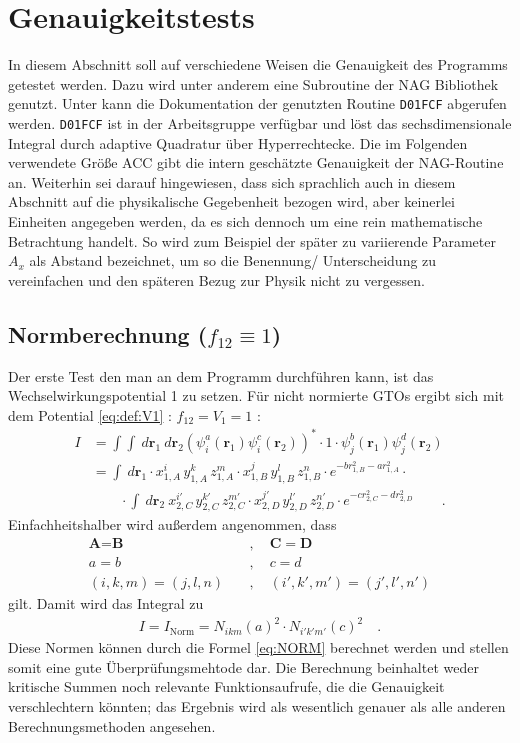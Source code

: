 \section{Genauigkeitstests}
%
In diesem Abschnitt soll auf verschiedene Weisen die Genauigkeit des Programms 
getestet werden. Dazu wird unter anderem eine Subroutine der NAG Bibliothek 
genutzt. Unter \cite{o:1a} kann die Dokumentation der genutzten Routine 
\texttt{D01FCF} 
abgerufen werden. \texttt{D01FCF} ist in der Arbeitsgruppe verfügbar und löst 
das 
sechsdimensionale Integral durch adaptive Quadratur über Hyperrechtecke. Die 
im Folgenden verwendete Größe ACC gibt die intern geschätzte Genauigkeit der 
NAG-Routine an. Weiterhin sei darauf hingewiesen, dass 
sich sprachlich auch in diesem Abschnitt auf die 
physikalische Gegebenheit bezogen wird, aber keinerlei 
Einheiten angegeben werden, da es sich dennoch um eine 
rein mathematische Betrachtung handelt. So wird zum 
Beispiel der später zu variierende Parameter $A_x$ als 
Abstand bezeichnet, um so die Benennung/ Unterscheidung zu 
vereinfachen und den späteren Bezug zur Physik nicht zu 
vergessen.
%
%
%
\subsection{Normberechnung ($f_{12}\equiv 1$)}\label{sec:T:norm}
%
Der erste Test den man an dem Programm durchführen kann, ist das 
Wechselwirkungspotential 1 zu setzen. Für nicht normierte GTOs ergibt sich 
mit dem Potential \ref{eq:def:V1} :  $f_{12}=V_1=1$ :
%
\begin{align*}
I&=\int\int\ d\textbf{r}_1\ d\textbf{r}_2 
(\psi_i^a(\textbf{r}_1)\psi_i^c(\textbf{r}_2))^*\cdot  1 \cdot  
\psi_j^b(\textbf{r}_1)\psi_j^d(\textbf{r}_2)\\
& =\int\ d\textbf{r}_1  \cdot 
x_{1,A}^i\,y_{1,A}^k\,z_{1,A}^m\cdot  
x_{1,B}^j\,y_{1,B}^l\,z_{1,B}^n\cdot e^{-b r_{1,B}^2-a 
	r_{1,A}^2} \cdot \\
&\qquad  \cdot \int\ d\textbf{r}_2\   
x_{2,C}^{i'}\,y_{2,C}^{k'}\,z_{2,C}^{m'} \cdot  
x_{2,D}^{j'}\,y_{2,D}^{l'}\,z_{2,D}^{n'}\cdot e^{-c r_{2,C}^2-d 
	r_{2,D}^2}\qquad.%
\end{align*}
%
Einfachheitshalber wird außerdem angenommen, dass 
%
\begin{align}\nonumber
\textbf{A}=\textbf{B} \quad&,\quad 
\textbf{C}=\textbf{D}\\\nonumber
a=b \quad&,\quad c=d\\\label{eq:tests:annahmen:norm}
(i,k,m)=(j,l,n) \quad&,\quad (i',k',m')=(j',l',n')
\end{align}
%
gilt. Damit wird das Integral zu
\begin{align}\label{eq:I_NORM}
I=I_\text{Norm}=N_{ikm}(a)^2 \cdot N_{i'k'm'}(c)^2 
\quad.
\end{align}
%
Diese Normen können durch die Formel \ref{eq:NORM} berechnet werden und stellen 
somit eine gute Überprüfungsmehtode dar. Die Berechnung 
beinhaltet weder 
kritische Summen noch relevante Funktionsaufrufe, die die Genauigkeit 
verschlechtern  könnten; das Ergebnis wird als wesentlich genauer als alle 
anderen Berechnungsmethoden angesehen.
%
